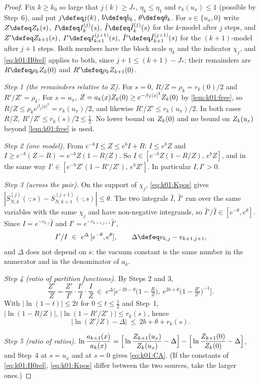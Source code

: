 \begin{proof}
Fix $k\ge k_0$ so large that $j(k)\ge J_*$, $\eta_k\le\eta_1$ and $r_k(u_x)\le1$ (possible by Step~6), and put $j\defeq j(k)$, $b\defeq b_k$, $\theta\defeq\theta_k$. For $s\in\{u_x,0\}$ write $Z\defeq\Zk(s)$, $I\defeq\Ik{j}(s)$, $\hat I\defeq\Ihat{j}(s)$ for the $k$-model after $j$ steps, and $Z'\defeq Z_{k+1}(s)$, $I'\defeq I^{(j+1)}_{k+1}(s)$, $\hat I'\defeq\hat I^{(j+1)}_{k+1}(s)$ for the $(k+1)$-model after $j+1$ steps. Both members have the block scale $\eta_k$ and the indicator $\chi_j$, and \eqref{eq:k01:H0rel} applies to both, since $j+1\le(k+1)-J_*$; their remainders are $R\defeq\rho_k\Zk(0)$ and $R'\defeq\rho_kZ_{k+1}(0)$.

\emph{Step 1 (the remainders relative to $Z$).} For $s=0$, $R/Z=\rho_k=r_k(0)/2$ and $R'/Z'=\rho_k$. For $s=u_x$, $Z=a_k(x)Z_{k}(0)\ge e^{-\beta_f|x|^2}Z_{k}(0)$ by \cref{lem:k01:free}, so $R/Z\le\rho_ke^{\beta_f|x|^2}=r_k(u_x)/2$, and likewise $R'/Z'\le r_k(u_x)/2$. In both cases $R/Z,\ R'/Z'\le r_k(s)/2\le\frac12$. No lower bound on $Z_{k}(0)$ and no bound on $Z_{k}(u_x)$ beyond \cref{lem:k01:free} is used.

\emph{Step 2 (one model).} From $e^{-b}I\le Z\le e^{b}I+R$: $I\le e^{b}Z$ and $I\ge e^{-b}(Z-R)=e^{-b}Z(1-R/Z)$. So $I\in[e^{-b}Z(1-R/Z),\,e^{b}Z]$, and in the same way $I'\in[e^{-b}Z'(1-R'/Z'),\,e^{b}Z']$. In particular $I,I'>0$.

\emph{Step 3 (across the pair).} On the support of $\chi_j$, \eqref{eq:k01:Kpos} gives $|S^{(j)}_{N,k}(\cdot;s)-S^{(j+1)}_{N,k+1}(\cdot;s)|\le\theta$. The two integrals $\hat I$, $\hat I'$ run over the same variables with the same $\chi_j$ and have non-negative integrands, so $\hat I'/\hat I\in[e^{-\theta},e^{\theta}]$. Since $I=e^{-v_{k,j}}\hat I$ and $I'=e^{-v_{k+1,j+1}}\hat I'$,
\[
I'/I\ \in\ e^{\Delta}\,[e^{-\theta},e^{\theta}],\qquad \Delta\defeq v_{k,j}-v_{k+1,j+1},
\]
and $\Delta$ does not depend on $s$: the vacuum constant is the same number in the numerator and in the denominator of $a_k$.

\emph{Step 4 (ratio of partition functions).} By Steps 2 and 3,
\[
\frac{Z'}{Z}=\frac{Z'}{I'}\cdot\frac{I'}{I}\cdot\frac{I}{Z}\ \in\ e^{\Delta}\Big[e^{-2b-\theta}\big(1-\tfrac RZ\big),\ e^{2b+\theta}\big(1-\tfrac{R'}{Z'}\big)^{-1}\Big].
\]
With $|\ln(1-t)|\le2t$ for $0\le t\le\frac12$ and Step~1, $|\ln(1-R/Z)|,\,|\ln(1-R'/Z')|\le r_k(s)$, hence
\[
\big|\ln(Z'/Z)-\Delta\big|\ \le\ 2b+\theta+r_k(s).
\]

\emph{Step 5 (ratio of ratios).} $\ln\dfrac{a_{k+1}(x)}{a_k(x)}=\Big[\ln\dfrac{Z_{k+1}(u_x)}{Z_{k}(u_x)}-\Delta\Big]-\Big[\ln\dfrac{Z_{k+1}(0)}{Z_{k}(0)}-\Delta\Big]$, and Step~4 at $s=u_x$ and at $s=0$ gives \eqref{eq:k01:CA}. (If the constants of \eqref{eq:k01:H0rel}, \eqref{eq:k01:Kpos} differ between the two sources, take the larger ones.)


\end{proof}
